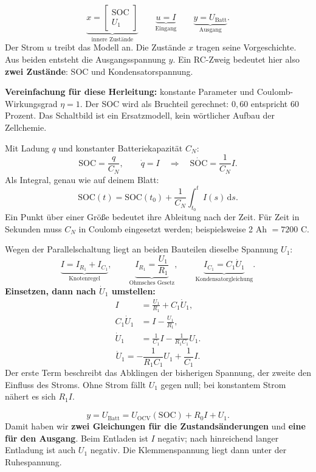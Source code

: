 \[
\underbrace{x=\begin{bmatrix}\mathrm{SOC}\\U_1\end{bmatrix}}_{\text{innere Zustände}}
\qquad
\underbrace{u=I}_{\text{Eingang}}
\qquad
\underbrace{y=U_{\mathrm{Batt}}}_{\text{Ausgang}}.
\]
Der Strom $u$ treibt das Modell an. Die Zustände $x$ tragen seine Vorgeschichte. Aus beiden entsteht die Ausgangsspannung $y$. Ein RC-Zweig bedeutet hier also \textbf{zwei Zustände}: SOC und Kondensatorspannung.

\textbf{Vereinfachung für diese Herleitung:} konstante Parameter und Coulomb-Wirkungsgrad $\eta=1$. Der SOC wird als Bruchteil gerechnet: $0{,}60$ entspricht 60 Prozent. Das Schaltbild ist ein Ersatzmodell, kein wörtlicher Aufbau der Zellchemie.

Mit Ladung $q$ und konstanter Batteriekapazität $C_N$:
\[
\mathrm{SOC}=\frac{q}{C_N},\qquad \dot q=I
\quad\Longrightarrow\quad
\boxed{\dot{\mathrm{SOC}}=\frac{1}{C_N}I.}
\]
Als Integral, genau wie auf deinem Blatt:
\[
\mathrm{SOC}(t)=\mathrm{SOC}(t_0)+\frac{1}{C_N}\int_{t_0}^{t}I(s)\,\mathrm ds.
\]
Ein Punkt über einer Größe bedeutet ihre Ableitung nach der Zeit. Für Zeit in Sekunden muss $C_N$ in Coulomb eingesetzt werden; beispielsweise 2 Ah $=7200$ C.

Wegen der Parallelschaltung liegt an beiden Bauteilen dieselbe Spannung $U_1$:
\[
\underbrace{I=I_{R_1}+I_{C_1}}_{\text{Knotenregel}},\qquad
\underbrace{I_{R_1}=\frac{U_1}{R_1}}_{\text{Ohmsches Gesetz}},\qquad
\underbrace{I_{C_1}=C_1\dot U_1}_{\text{Kondensatorgleichung}}.
\]
\textbf{Einsetzen, dann nach $\dot U_1$ umstellen:}
\[
\begin{aligned}
I&=\frac{U_1}{R_1}+C_1\dot U_1,\\[4pt]
C_1\dot U_1&=I-\frac{U_1}{R_1},\\[4pt]
\dot U_1&=\frac{1}{C_1}I-\frac{1}{R_1C_1}U_1.
\end{aligned}
\]
\[
\boxed{\dot U_1=-\frac{1}{R_1C_1}U_1+\frac{1}{C_1}I.}
\]
Der erste Term beschreibt das Abklingen der bisherigen Spannung, der zweite den Einfluss des Stroms. Ohne Strom fällt $U_1$ gegen null; bei konstantem Strom nähert es sich $R_1I$.

\[
\boxed{y=U_{\mathrm{Batt}}=U_{\mathrm{OCV}}(\mathrm{SOC})+R_0I+U_1.}
\]
Damit haben wir \textbf{zwei Gleichungen für die Zustandsänderungen} und \textbf{eine für den Ausgang}. Beim Entladen ist $I$ negativ; nach hinreichend langer Entladung ist auch $U_1$ negativ. Die Klemmenspannung liegt dann unter der Ruhespannung.

